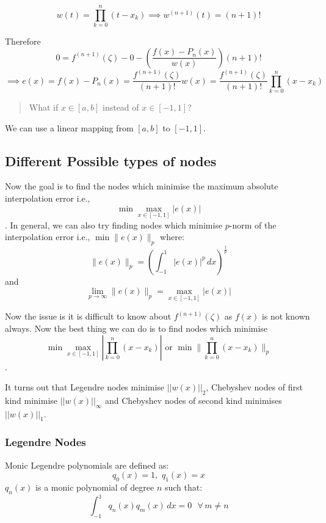 \documentclass[
]{book}
\begin{document}
\[w(t) = \prod_{k=0}^n(t-x_k)\implies w^{(n+1)}(t) = (n+1)!\]

Therefore \[0 = f^{(n+1)}(\zeta)-0 - \left(\frac{f(x)-P_n(x)}{w(x)}\right)(n+1)!\]
\[\implies e(x) = f(x)-P_n(x) = \frac{f^{(n+1)}(\zeta)}{(n+1)!}w(x)= \frac{f^{(n+1)}(\zeta)}{(n+1)!}\prod_{k=0}^n(x-x_k)\]

\begin{quote}
What if \(x\in[a,b]\) instead of \(x\in[-1,1]\)?
\end{quote}

We can use a linear mapping from \([a,b]\) to \([-1,1]\).

\hypertarget{different-possible-types-of-nodes}{%
\subsection{Different Possible types of nodes}\label{different-possible-types-of-nodes}}

Now the goal is to find the nodes which minimise the maximum absolute interpolation error i.e., \[\min \max_{x\in[-1,1]} |e(x)|\]. In general, we can also try finding nodes which minimise \(p\)-norm of the interpolation error i.e., \(\min \lVert e(x) \rVert_p\) where:
\[\lVert e(x) \rVert_p = \left( \int_{-1}^1 |e(x)|^p \, dx\right)^{\frac{1}{p}}\] and \[\lim_{p\to\infty} \lVert e(x) \rVert_p = \max_{x\in[-1,1]}|e(x)|\]

Now the issue is it is difficult to know about \(f^{(n+1)}(\zeta)\) as \(f(x)\) is not known always. Now the best thing we can do is to find nodes which minimise \[\min \max_{x\in[-1,1]}\left|\prod_{k=0}^n(x-x_k)\right| \text{ or } \min \lVert \prod_{k=0}^n(x-x_k) \rVert_p\].

It turns out that Legendre nodes minimise \(||w(x)||_2\), Chebyshev nodes of first kind minimise \(||w(x)||_{\infty}\) and Chebyshev nodes of second kind minimises \(||w(x)||_1\).

\hypertarget{legendre-nodes}{%
\subsubsection{Legendre Nodes}\label{legendre-nodes}}

Monic Legendre polynomials are defined as:
\[q_0(x) = 1, \, \, q_1(x) = x\]
\(q_n(x)\) is a monic polynomial of degree \(n\) such that:
\begin{equation}
\int_{-1}^1 q_n(x) q_m(x) \, dx = 0 \ \  \ \forall \,  m\neq n
\end{equation}
\end{document}

